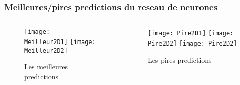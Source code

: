\begin{frame}[fragile]
    \frametitle{Meilleures/pires predictions du reseau de neurones}

    \begin{columns}
    \begin{column}{0.5\textwidth}
        \begin{figure}
        \texttt{[image: Meilleur2D1]}       
        \texttt{[image: Meilleur2D2]}       
        \caption{Les meilleures predictions}
        \end{figure}
     \end{column}
     \begin{column}{0.5\textwidth}
        \begin{figure}
        \texttt{[image: Pire2D1]}       
        \texttt{[image: Pire2D2]}       
        \texttt{[image: Pire2D2]}       
        \caption{Les pires predictions}
        \end{figure}
     \end{column}
    \end{columns}

\end{frame}

